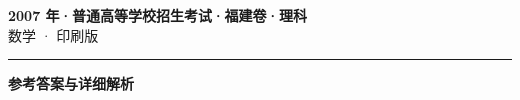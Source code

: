 \documentclass[zihao=5, a4paper]{ctexart}
\begin{document}
\begin{center}
  {\Large\bfseries 2007 年·普通高等学校招生考试·福建卷·理科}\\[4pt]
  {\large 数学 · 印刷版}
\end{center}
\medskip
{}

\par\bigskip\hrule\bigskip
{}
\begin{center}{\large\bfseries 参考答案与详细解析}\end{center}
\smallskip

\end{document}
